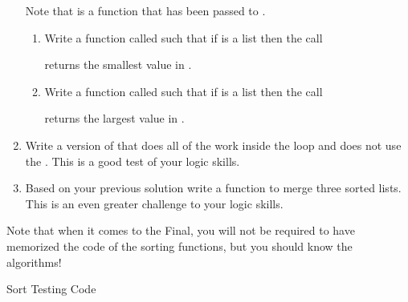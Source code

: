 \documentclass[letterpaper,10pt,english]{sphinxmanual}
\begin{document}
\begin{enumerate}
Note that  is a function that has been passed to .
\begin{enumerate}
\item {} 
Write a function called  such that if 
is a list then the call

%
\begin{sphinxVerbatim}[commandchars=\\\{\}]
\end{sphinxVerbatim}

returns the smallest value in .

\item {} 
Write a function called  such that if 
is a list then the call

%
\begin{sphinxVerbatim}[commandchars=\\\{\}]
\end{sphinxVerbatim}

returns the largest value in .

\end{enumerate}

\item {} 
Write a version of  that does all of the work inside the
 loop and does not use the . This is a good test
of your logic skills.

\item {} 
Based on your previous solution write a function to merge three
sorted lists. This is an even greater challenge to your logic skills.

\end{enumerate}

Note that when it comes to the Final, you will not be required to have
memorized the code of the sorting functions, but you should know the
algorithms!

Sort Testing Code
\end{document}
